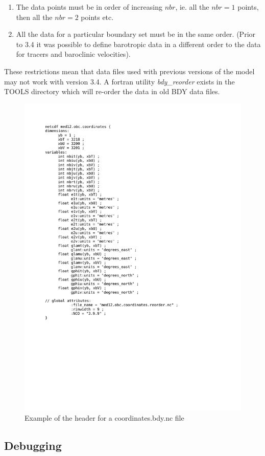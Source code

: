\mbox{}

\begin{enumerate}
\item The data points must be in order of increasing $nbr$, ie.
all
  the $nbr=1$ points, then all the $nbr=2$ points etc.
\item All the data for a particular boundary set must be in the
same
order. (Prior to 3.4 it was possible to define barotropic data
in a
different order to the data for tracers and baroclinic
velocities).
\end{enumerate}

\mbox{}

These restrictions mean that data files used with previous
versions of
the model may not work with version 3.4. A fortran utility
{\it bdy\_reorder} exists in the TOOLS directory which will
re-order the
data in old BDY data files. 

\begin{figure}[!t]     \begin{center}
\includegraphics[width=1.0\textwidth]{./TexFiles/Figures/Fig_LBC_nc_header.pdf}
\caption {     \label{Fig_LBC_nc_header} 
Example of the header for a coordinates.bdy.nc file}
\end{center}   \end{figure}


\subsection{Debugging}
\label{Debug}


